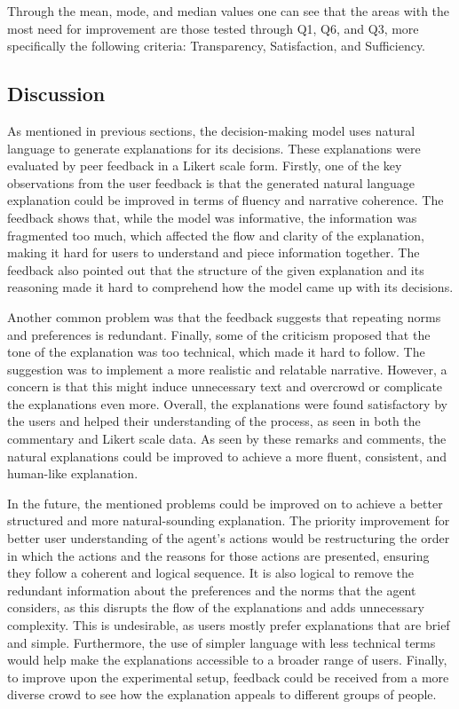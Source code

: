 \documentclass[sigconf,nonacm]{acmart}
\begin{document}
Through the mean, mode, and median values one can see that the areas with the most need for improvement are those tested through Q1, Q6, and Q3, more specifically the following criteria: Transparency, Satisfaction, and Sufficiency.


\subsection{Discussion} \label{subsec:discussion}
As mentioned in previous sections, the decision-making model uses natural language to generate explanations for its decisions. These explanations were evaluated by peer feedback in a Likert scale form. Firstly, one of the key observations from the user feedback is that the generated natural language explanation could be improved in terms of fluency and narrative coherence. The feedback shows that, while the model was informative, the information was fragmented too much, which affected the flow and clarity of the explanation, making it hard for users to understand and piece information together. The feedback also pointed out that the structure of the given explanation and its reasoning made it hard to comprehend how the model came up with its decisions.

Another common problem was that the feedback suggests that repeating norms and preferences is redundant. Finally, some of the criticism proposed that the tone of the explanation was too technical, which made it hard to follow. The suggestion was to implement a more realistic and relatable narrative. However, a concern is that this might induce unnecessary text and overcrowd or complicate the explanations even more. Overall, the explanations were found satisfactory by the users and helped their understanding of the process, as seen in both the commentary and Likert scale data. As seen by these remarks and comments, the natural explanations could be improved to achieve a more fluent, consistent, and human-like explanation.

In the future, the mentioned problems could be improved on to achieve a better structured and more natural-sounding explanation. The priority improvement for better user understanding of the agent's actions would be restructuring the order in which the actions and the reasons for those actions are presented, ensuring they follow a coherent and logical sequence. It is also logical to remove the redundant information about the preferences and the norms that the agent considers, as this disrupts the flow of the explanations and adds unnecessary complexity. This is undesirable, as users mostly prefer explanations that are brief and simple. Furthermore, the use of simpler language with less technical terms would help make the explanations accessible to a broader range of users. Finally, to improve upon the experimental setup, feedback could be received from a more diverse crowd to see how the explanation appeals to different groups of people.
\end{document}
